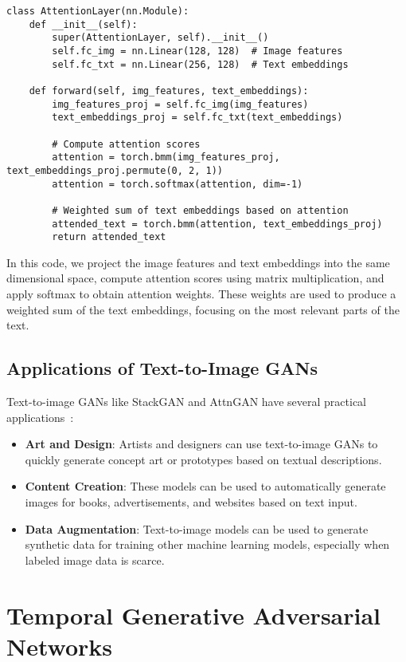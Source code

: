 \begin{lstlisting}[style=python]
class AttentionLayer(nn.Module):
    def __init__(self):
        super(AttentionLayer, self).__init__()
        self.fc_img = nn.Linear(128, 128)  # Image features
        self.fc_txt = nn.Linear(256, 128)  # Text embeddings

    def forward(self, img_features, text_embeddings):
        img_features_proj = self.fc_img(img_features)
        text_embeddings_proj = self.fc_txt(text_embeddings)

        # Compute attention scores
        attention = torch.bmm(img_features_proj, text_embeddings_proj.permute(0, 2, 1))
        attention = torch.softmax(attention, dim=-1)

        # Weighted sum of text embeddings based on attention
        attended_text = torch.bmm(attention, text_embeddings_proj)
        return attended_text
\end{lstlisting}

In this code, we project the image features and text embeddings into the same dimensional space, compute attention scores using matrix multiplication, and apply softmax to obtain attention weights. These weights are used to produce a weighted sum of the text embeddings, focusing on the most relevant parts of the text.

\subsection{Applications of Text-to-Image GANs}

Text-to-image GANs like StackGAN and AttnGAN have several practical applications~\cite{adadi2021survey}:
\begin{itemize}
    \item \textbf{Art and Design}: Artists and designers can use text-to-image GANs to quickly generate concept art or prototypes based on textual descriptions.
    \item \textbf{Content Creation}: These models can be used to automatically generate images for books, advertisements, and websites based on text input.
    \item \textbf{Data Augmentation}: Text-to-image models can be used to generate synthetic data for training other machine learning models, especially when labeled image data is scarce.
\end{itemize}

\section{Temporal Generative Adversarial Networks}

